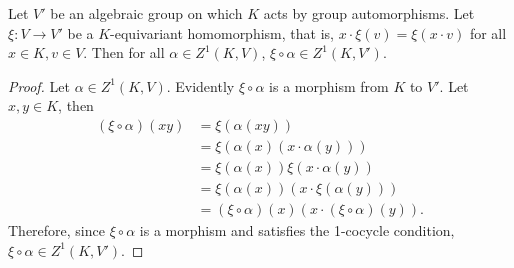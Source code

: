 \begin{lemma} \label{xi}
	Let $V'$ be an algebraic group on which $K$ acts by group automorphisms.
	Let $\xi: V \rightarrow V'$ be a $K$-equivariant homomorphism, that is, $x \cdot \xi(v) = \xi(x \cdot v)$ for all $x \in K, v \in V$. Then for all $\alpha \in Z^1(K, V)$, $\xi \circ \alpha \in Z^1(K, V')$. 
\end{lemma}
\begin{proof}
	Let $\alpha \in Z^1(K, V)$. Evidently $\xi \circ \alpha$ is a morphism from $K$ to $V'$. Let $x, y \in K$, then
	\begin{align*}
		(\xi \circ \alpha)(xy) &= \xi\left(\alpha(xy)\right) \\
			&= \xi\left(\alpha(x)(x \cdot \alpha(y))\right) \\
			&= \xi(\alpha(x))\xi(x \cdot \alpha(y)) \\
			&= \xi(\alpha(x))\left(x \cdot \xi(\alpha(y))\right) \\
			&= (\xi \circ \alpha)(x)\left(x \cdot (\xi \circ \alpha)(y)\right).
	\end{align*}
	Therefore, since $\xi \circ \alpha$ is a morphism and satisfies the 1-cocycle condition, $\xi \circ \alpha \in Z^1(K, V')$.
\end{proof}

